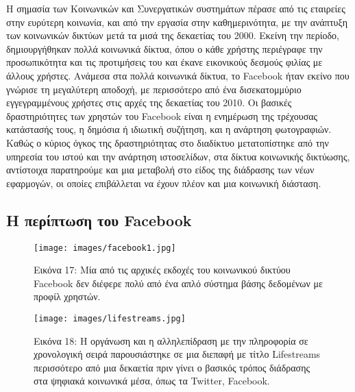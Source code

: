 \documentclass[
]{article}
\begin{document}
Η σημασία των Κοινωνικών και Συνεργατικών συστημάτων πέρασε από τις
εταιρείες στην ευρύτερη κοινωνία, και από την εργασία στην
καθημερινότητα, με την ανάπτυξη των κοινωνικών δικτύων μετά τα μισά της
δεκαετίας του 2000. Εκείνη την περίοδο, δημιουργήθηκαν πολλά κοινωνικά
δίκτυα, όπου ο κάθε χρήστης περιέγραφε την προσωπικότητα και τις
προτιμήσεις του και έκανε εικονικούς δεσμούς φιλίας με άλλους χρήστες.
Ανάμεσα στα πολλά κοινωνικά δίκτυα, το Facebook ήταν εκείνο που γνώρισε
τη μεγαλύτερη αποδοχή, με περισσότερο από ένα δισεκατομμύριο
εγγεγραμμένους χρήστες στις αρχές της δεκαετίας του 2010. Οι βασικές
δραστηριότητες των χρηστών του Facebook είναι η ενημέρωση της τρέχουσας
κατάστασής τους, η δημόσια ή ιδιωτική συζήτηση, και η ανάρτηση
φωτογραφιών. Καθώς ο κύριος όγκος της δραστηριότητας στο διαδίκτυο
μετατοπίστηκε από την υπηρεσία του ιστού και την ανάρτηση ιστοσελίδων,
στα δίκτυα κοινωνικής δικτύωσης, αντίστοιχα παρατηρούμε και μια μεταβολή
στο είδος της διάδρασης των νέων εφαρμογών, οι οποίες επιβάλλεται να
έχουν πλέον και μια κοινωνική διάσταση.

\hypertarget{ux3b7-ux3c0ux3b5ux3c1ux3afux3c0ux3c4ux3c9ux3c3ux3b7-ux3c4ux3bfux3c5-facebook}{%
\subsection{Η περίπτωση του
Facebook}\label{ux3b7-ux3c0ux3b5ux3c1ux3afux3c0ux3c4ux3c9ux3c3ux3b7-ux3c4ux3bfux3c5-facebook}}

\leavevmode{}%
\begin{figure}
\hypertarget{fig:facebook1}{%
\centering
\texttt{[image: images/facebook1.jpg]}
\caption{Εικόνα 17: Μία από τις αρχικές εκδοχές του κοινωνικού δικτύου
Facebook δεν διέφερε πολύ από ένα απλό σύστημα βάσης δεδομένων με προφίλ
χρηστών.}\label{fig:facebook1}
}
\end{figure}

\leavevmode{}%
\begin{figure}
\hypertarget{fig:lifestreams}{%
\centering
\texttt{[image: images/lifestreams.jpg]}
\caption{Εικόνα 18: Η οργάνωση και η αλληλεπίδραση με την πληροφορία σε
χρονολογική σειρά παρουσιάστηκε σε μια διεπαφή με τίτλο Lifestreams
περισσότερο από μια δεκαετία πριν γίνει ο βασικός τρόπος διάδρασης στα
ψηφιακά κοινωνικά μέσα, όπως τα Twitter,
Facebook.}\label{fig:lifestreams}
}
\end{figure}
\end{document}
